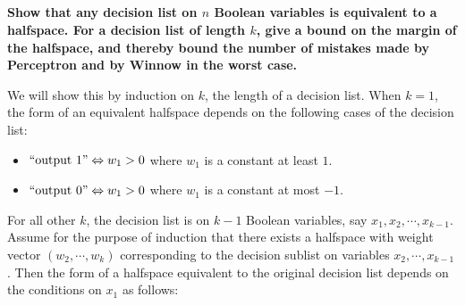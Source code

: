 \documentclass[a4paper,12pt]{article}
\theoremstyle{remark}
\begin{document}
\subsection{}
    \boldmath\textbf{Show that any decision list on $n$ Boolean variables is equivalent to a halfspace. For a decision list of length $k$, give a bound on the margin of the halfspace, and thereby bound the number of mistakes made by Perceptron and by Winnow in the worst case.
    }\unboldmath \par
    We will show this by induction on $k$, the length of a decision list. When $k = 1$, the form of an equivalent halfspace depends on the following cases of the decision list:
    \begin{itemize}
        \item
            $``\text{output } 1" \Leftrightarrow w_1 > 0$ where $w_1$ is a constant at least $1$.
        \item
            $``\text{output } 0" \Leftrightarrow w_1 > 0$ where $w_1$ is a constant at most $-1$.
    \end{itemize}
    For all other $k$, the decision list is on $k - 1$ Boolean variables, say $x_1, x_2, \cdots, x_{k - 1}$. Assume for the purpose of induction that there exists a halfspace with weight vector $(w_2, \cdots, w_k)$ corresponding to the decision sublist on variables $x_2, \cdots, x_{k - 1}$. Then the form of a halfspace equivalent to the original decision list depends on the conditions on $x_1$ as follows:
\end{document}
